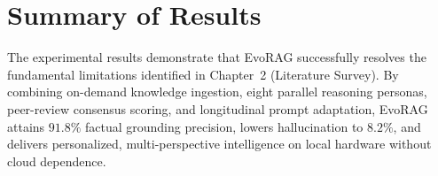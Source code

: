 \section{Summary of Results}
The experimental results demonstrate that EvoRAG successfully resolves the fundamental limitations identified in Chapter~2 (Literature Survey). By combining on-demand knowledge ingestion, eight parallel reasoning personas, peer-review consensus scoring, and longitudinal prompt adaptation, EvoRAG attains $91.8\%$ factual grounding precision, lowers hallucination to $8.2\%$, and delivers personalized, multi-perspective intelligence on local hardware without cloud dependence.
